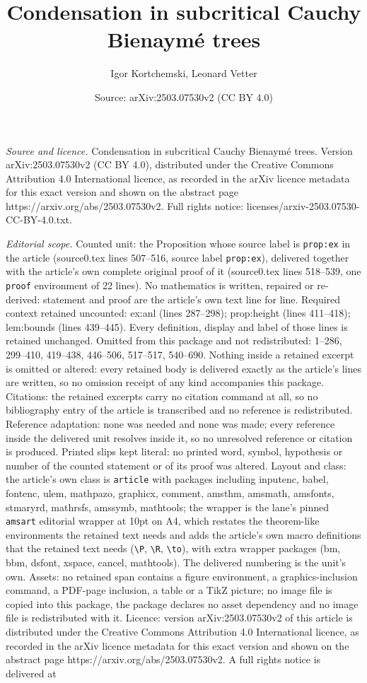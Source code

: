 \documentclass[10pt,a4paper]{amsart}
\title[Condensation in subcritical Cauchy Bienaym\'e trees]{Condensation in subcritical Cauchy Bienaym\'e trees}
\author{Igor Kortchemski, Leonard Vetter}
\date{Source: arXiv:2503.07530v2 (CC BY 4.0)}
\begin{document}
\maketitle

\noindent\emph{Source and licence.} Condensation in subcritical Cauchy Bienaym\'e trees. Version arXiv:2503.07530v2 (CC BY 4.0), distributed under the Creative Commons Attribution 4.0 International licence, as recorded in the arXiv licence metadata for this exact version and shown on the abstract page https://arxiv.org/abs/2503.07530v2. Full rights notice: licenses/arxiv-2503.07530-CC-BY-4.0.txt.\par\smallskip

\noindent\textit{Editorial scope.} Counted unit: the Proposition whose source label is \texttt{prop:ex} in the article (source0.tex lines 507--516, source label \texttt{prop:ex}), delivered together with the article's own complete original proof of it (source0.tex lines 518--539, one \texttt{proof} environment of 22 lines). No mathematics is written, repaired or re-derived: statement and proof are the article's own text line for line. Required context retained uncounted: ex:anl (lines 287--298); prop:height (lines 411--418); lem:bounds (lines 439--445). Every definition, display and label of those lines is retained unchanged. Omitted from this package and not redistributed: 1--286, 299--410, 419--438, 446--506, 517--517, 540--690. Nothing inside a retained excerpt is omitted or altered: every retained body is delivered exactly as the article's lines are written, so no omission receipt of any kind accompanies this package. Citations: the retained excerpts carry no citation command at all, so no bibliography entry of the article is transcribed and no reference is redistributed. Reference adaptation: none was needed and none was made; every reference inside the delivered unit resolves inside it, so no unresolved reference or citation is produced. Printed slips kept literal: no printed word, symbol, hypothesis or number of the counted statement or of its proof was altered. Layout and class: the article's own class is \texttt{article} with packages including inputenc, babel, fontenc, ulem, mathpazo, graphicx, comment, amsthm, amsmath, amsfonts, stmaryrd, mathrsfs, amssymb, mathtools; the wrapper is the lane's pinned \texttt{amsart} editorial wrapper at 10pt on A4, which restates the theorem-like environments the retained text needs and adds the article's own macro definitions that the retained text needs (\texttt{\textbackslash P}, \texttt{\textbackslash R}, \texttt{\textbackslash to}), with extra wrapper packages (bm, bbm, dsfont, xspace, cancel, mathtools). The delivered numbering is the unit's own. Assets: no retained span contains a figure environment, a graphics-inclusion command, a PDF-page inclusion, a table or a TikZ picture; no image file is copied into this package, the package declares no asset dependency and no image file is redistributed with it. Licence: version arXiv:2503.07530v2 of this article is distributed under the Creative Commons Attribution 4.0 International licence, as recorded in the arXiv licence metadata for this exact version and shown on the abstract page https://arxiv.org/abs/2503.07530v2. A full rights notice is delivered at 
\end{document}
